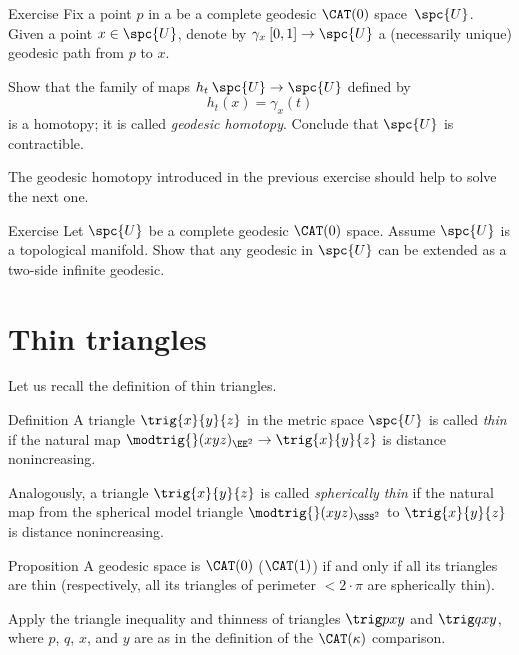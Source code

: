 \begin{thm}{Exercise}\label{ex:contractible}
Fix a point $p$ in a  be a complete geodesic $\CAT(0)$ space~$\spc{U}$.
Given a point $x\in \spc{U}$, denote by $\gamma_x\:[0,1]\to \spc{U}$ a (necessarily unique) geodesic path from $p$ to $x$.

Show that the family of maps $h_t\: \spc{U}\to \spc{U}$ defined by 
\[h_t(x)= \gamma_x(t)\]
is a homotopy; it is called \emph{geodesic homotopy}. 
Conclude that $\spc{U}$ is contractible.
\end{thm}

The geodesic homotopy introduced in the previous exercise should help to solve the next one.

\begin{thm}{Exercise}\label{ex:CAT-mnfld=>ext.geod}
Let $\spc{U}$ be a complete geodesic $\CAT(0)$ space.
Assume $\spc{U}$ is a topological manifold.
Show that any geodesic in $\spc{U}$ can be extended 
as a two-side infinite geodesic.
\end{thm}

\section{Thin triangles}

Let us recall the definition of thin triangles.

\begin{thm}{Definition}\label{def:k-thin}
A triangle $\trig{x}{y}{z}$ in the metric space $\spc{U}$ 
is called \emph{thin} if the natural map $\modtrig{}({x}{y}{z})_{\EE^2}\to \trig{x}{y}{z}$ is distance nonincreasing.

{\sloppy 

Analogously, a triangle $\trig{x}{y}{z}$ 
is called \emph{spherically thin} if
the natural map from the spherical model triangle $\modtrig{}({x}{y}{z})_{\SSS^2}$ to $\trig{x}{y}{z}$ is distance nonincreasing.

}
\end{thm}

\begin{thm}{Proposition}\label{prop:thin=cat}
A geodesic space is $\CAT(0)$ 
($\CAT(1)$) 
if and only if 
all its triangles are thin (respectively, all its triangles of perimeter $<2\cdot\pi$ are spherically thin).
\end{thm}

Apply  the triangle inequality and thinness of triangles $\trig pxy$ and $\trig qxy$, where $p$, $q$, $x$, and $y$ are as in the definition of the $\CAT(\kappa)$ comparison.

